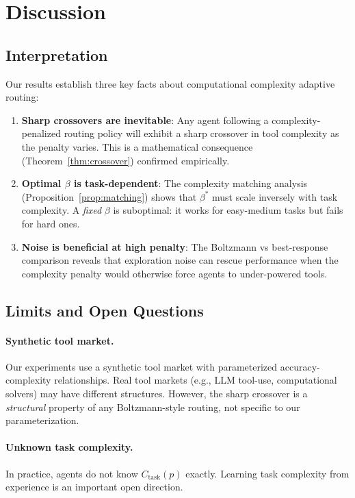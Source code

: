 \documentclass[12pt]{article}
\theoremstyle{definition}
\begin{document}
\section{Discussion}

\subsection{Interpretation}

Our results establish three key facts about computational complexity adaptive routing:

\begin{enumerate}
  \item \textbf{Sharp crossovers are inevitable}: Any agent following a complexity-penalized routing policy will exhibit a sharp crossover in tool complexity as the penalty varies. This is a mathematical consequence (Theorem~\ref{thm:crossover}) confirmed empirically.

  \item \textbf{Optimal $\beta$ is task-dependent}: The complexity matching analysis (Proposition~\ref{prop:matching}) shows that $\beta^*$ must scale inversely with task complexity. A \emph{fixed} $\beta$ is suboptimal: it works for easy-medium tasks but fails for hard ones.

  \item \textbf{Noise is beneficial at high penalty}: The Boltzmann vs best-response comparison reveals that exploration noise can rescue performance when the complexity penalty would otherwise force agents to under-powered tools.
\end{enumerate}

\subsection{Limits and Open Questions}

\paragraph{Synthetic tool market.} Our experiments use a synthetic tool market with parameterized accuracy-complexity relationships. Real tool markets (e.g., LLM tool-use, computational solvers) may have different structures. However, the sharp crossover is a \emph{structural} property of any Boltzmann-style routing, not specific to our parameterization.

\paragraph{Unknown task complexity.} In practice, agents do not know $C_{\mathrm{task}}(p)$ exactly. Learning task complexity from experience is an important open direction.
\end{document}
